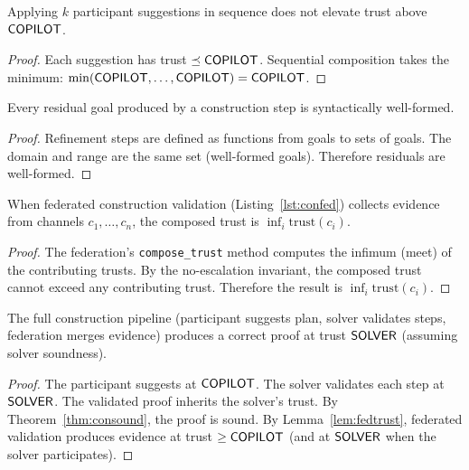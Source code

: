 \documentclass[11pt]{article}
\begin{document}
\begin{lemma}%
\label{lem:trustnoaccum}
Applying $k$ participant suggestions in sequence does not
elevate trust above $\mathsf{COPILOT}$.
\end{lemma}
\begin{proof}
Each suggestion has trust $\preceq \mathsf{COPILOT}$.  Sequential
composition takes the minimum: $\min(\mathsf{COPILOT}, \ldots,
\mathsf{COPILOT}) = \mathsf{COPILOT}$.
\end{proof}

\begin{lemma}%
\label{lem:residwf}
Every residual goal produced by a construction step is
syntactically well-formed.
\end{lemma}
\begin{proof}
Refinement steps are defined as functions from goals to
sets of goals.  The domain and range are the same set
(well-formed goals).  Therefore residuals are well-formed.
\end{proof}

\begin{lemma}%
\label{lem:fedtrust}
When federated construction validation (Listing~\ref{lst:confed})
collects evidence from channels $c_1, \ldots, c_n$, the composed
trust is $\inf_i \mathrm{trust}(c_i)$.
\end{lemma}
\begin{proof}
The federation's \texttt{compose\_trust} method computes the
infimum (meet) of the contributing trusts.  By the no-escalation
invariant, the composed trust cannot exceed any contributing
trust.  Therefore the result is $\inf_i \mathrm{trust}(c_i)$.
\end{proof}

\begin{proposition}%
\label{prop:fullconcorrect}
The full construction pipeline (participant suggests plan,
solver validates steps, federation merges evidence) produces
a correct proof at trust $\mathsf{SOLVER}$ (assuming solver soundness).
\end{proposition}
\begin{proof}
The participant suggests at $\mathsf{COPILOT}$.  The solver validates
each step at $\mathsf{SOLVER}$.  The validated proof inherits the
solver's trust.  By Theorem~\ref{thm:consound}, the proof is
sound.  By Lemma~\ref{lem:fedtrust}, federated validation
produces evidence at trust $\geq \mathsf{COPILOT}$ (and at $\mathsf{SOLVER}$
when the solver participates).
\end{proof}
\end{document}
